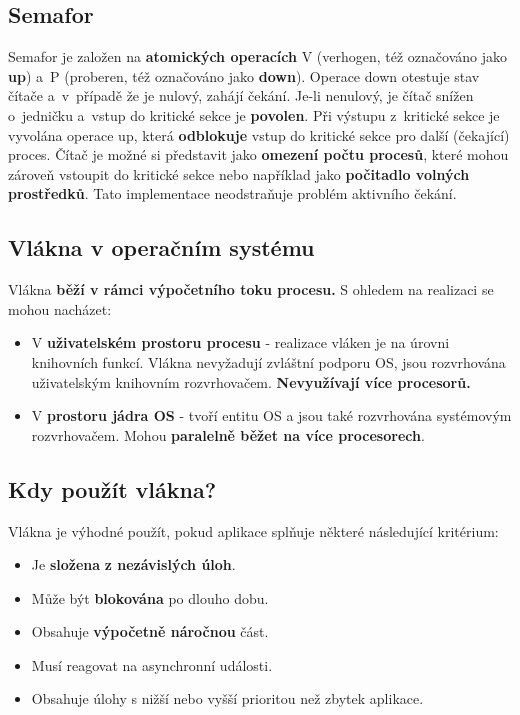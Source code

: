 \subsection{Semafor}
Semafor je založen na \textbf{atomických operacích} V (verhogen, též označováno jako \textbf{up}) a P (proberen, též označováno jako \textbf{down}). Operace down otestuje stav čítače a v případě že je nulový, zahájí čekání. Je-li nenulový, je čítač snížen o jedničku a vstup do kritické sekce je \textbf{povolen}. Při výstupu z kritické sekce je vyvolána operace up, která \textbf{odblokuje} vstup do kritické sekce pro další (čekající) proces. Čítač je možné si představit jako \textbf{omezení počtu procesů}, které mohou zároveň vstoupit do kritické sekce nebo například jako \textbf{počitadlo volných prostředků}. Tato implementace neodstraňuje problém aktivního čekání.

\subsection{Vlákna v operačním systému}
Vlákna \textbf{běží v rámci výpočetního toku procesu.} S ohledem na realizaci se mohou nacházet:
\begin{itemize}
	\item V \textbf{uživatelském prostoru procesu} - realizace vláken je na úrovni knihovních funkcí. Vlákna nevyžadují zvláštní podporu OS, jsou rozvrhována uživatelským knihovním rozvrhovačem. \textbf{Nevyužívají více procesorů.}
	\item V \textbf{prostoru jádra OS} - tvoří entitu OS a jsou také rozvrhována systémovým rozvrhovačem. Mohou \textbf{paralelně běžet na více procesorech}.
\end{itemize}

\subsection{Kdy použít vlákna?}
Vlákna je výhodné použít, pokud aplikace splňuje některé následující kritérium:
\begin{itemize}
	\item Je \textbf{složena}\textbf{ z nezávislých úloh}.
	\item Může být \textbf{blokována} po dlouho dobu.
	\item Obsahuje \textbf{výpočetně náročnou} část.
	\item Musí reagovat na asynchronní události.
	\item Obsahuje úlohy s nižší nebo vyšší prioritou než zbytek aplikace.
\end{itemize}

